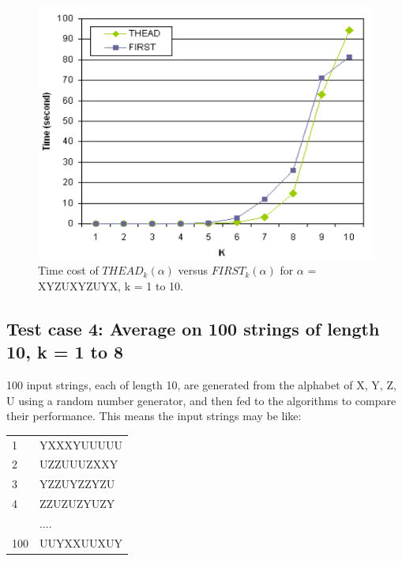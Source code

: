 \documentclass{sig-alternate-05-2015}
\begin{document}
\begin{figure}
\centering
\includegraphics[scale=0.5]{figure4.PNG}
\caption{Time cost of $THEAD_k(\alpha)$ versus $FIRST_k(\alpha)$
for $\alpha$ = XYZUXYZUYX, k = 1 to 10.}
\label{fig:4}
\end{figure}


\subsection{Test case 4: Average on 100 strings of length 10, k
= 1 to 8}
100 input strings, each of length 10, are generated from the
alphabet of {X, Y, Z, U} using a random number generator,
and then fed to the algorithms to compare their performance.
This means the input strings may be like:
\begin{tabular}{ll}
1   & YXXXYUUUUU                                                                                                   \\
2   & UZZUUUZXXY                                                                                                  \\
3   & YZZUYZZYZU                                                                                                \\
4   & ZZUZUZYUZY                                                                                                \\
    & ....                                                                                                \\
100 &UUYXXUUXUY \\
\end{tabular}
\end{document}
